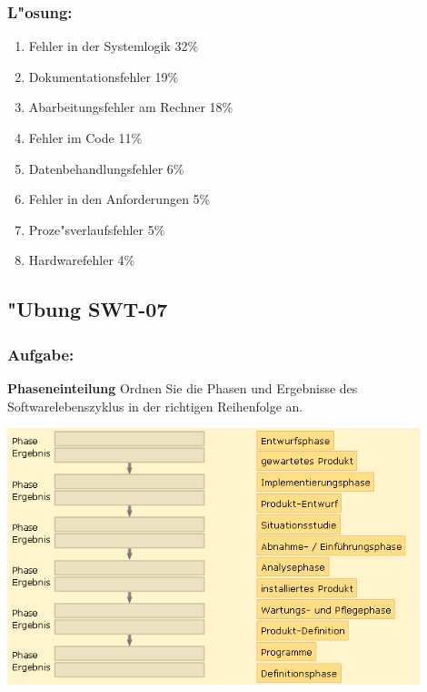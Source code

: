 \subsubsection*{L"osung:}

\begin{enumerate}
  \item Fehler in der Systemlogik 32\%
  \item Dokumentationsfehler 19\%
  \item Abarbeitungsfehler am Rechner 18\%
  \item Fehler im Code 11\%
  \item Datenbehandlungsfehler 6\%
  \item Fehler in den Anforderungen 5\%
  \item Proze"sverlaufsfehler 5\%
  \item Hardwarefehler 4\%
\end{enumerate}

\newpage
\subsection{"Ubung SWT-07}
\subsubsection*{Aufgabe:}

\begin{framed}
\textbf{Phaseneinteilung}
\smallbreak
Ordnen Sie die Phasen und Ergebnisse des Softwarelebenszyklus in der richtigen Reihenfolge an.
\bigbreak
\begin{center}
\includegraphics[width=0.9\textwidth]{./images/ueb01-07.png}
\end{center}
\end{framed}
\bigbreak
\bigbreak

